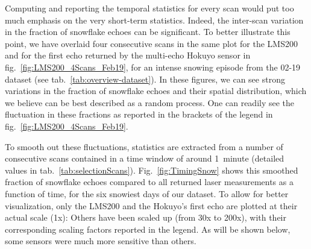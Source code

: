 Computing and reporting the temporal statistics for every scan would put too much emphasis on the very short-term statistics. Indeed, the inter-scan variation in the fraction of snowflake echoes can be significant. To better illustrate this point, we have overlaid four consecutive scans in the same plot for the LMS200 and for the first echo returned by the multi-echo Hokuyo sensor in fig.~\ref{fig:LMS200_4Scans_Feb19}, for an intense snowing episode from the 02-19 dataset (see tab.~\ref{tab:overview-dataset}). In these figures, we can see strong variations in the fraction of snowflake echoes and their spatial distribution, which we believe can be best described as a random process. One can readily see the fluctuation in these fractions as reported in the brackets of the legend in fig.~\ref{fig:LMS200_4Scans_Feb19}. 

To smooth out these fluctuations, statistics are extracted from a number of consecutive scans contained in a time window of around 1~minute (detailed values in tab.~\ref{tab:selectionScans}). Fig.~\ref{fig:TimingSnow} shows this smoothed fraction of snowflake echoes compared to all returned laser measurements as a function of time, for the six snowiest days of our dataset. To allow for better visualization, only the LMS200 and the Hokuyo's first echo are plotted at their actual scale (1x): Others have been scaled up (from 30x to 200x), with their corresponding scaling factors reported in the legend. As will be shown below, some sensors were much more sensitive than others.

